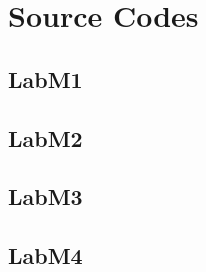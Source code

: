 \documentclass{article}
\begin{document}


\section{Source Codes}

\subsection{LabM1}


\subsection{LabM2}


\subsection{LabM3}


\subsection{LabM4}


\end{document}
